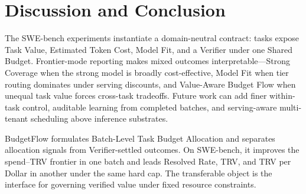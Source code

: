 \documentclass[letterpaper]{article}
\newcommand{\method}{BudgetFlow\xspace}
\newcommand{\trv}{TRV\xspace}
\newcommand{\taskvalue}{Task Value\xspace}
\newcommand{\tokencost}{Estimated Token Cost\xspace}
\newcommand{\modelfit}{Model Fit\xspace}
\newcommand{\sharedbudget}{Shared Budget\xspace}
\newcommand{\verifier}{Verifier\xspace}
\begin{document}
\section{Discussion and Conclusion}
\label{sec:discussion}
The SWE-bench experiments instantiate a domain-neutral contract: tasks expose \taskvalue, \tokencost, \modelfit, and a \verifier under one \sharedbudget. Frontier-mode reporting makes mixed outcomes interpretable---Strong Coverage when the strong model is broadly cost-effective, Model Fit when tier routing dominates under serving discounts, and Value-Aware Budget Flow when unequal task value forces cross-task tradeoffs. Future work can add finer within-task control, auditable learning from completed batches, and serving-aware multi-tenant scheduling above inference substrates.

\method formulates Batch-Level Task Budget Allocation and separates allocation signals from \verifier-settled outcomes. On SWE-bench, it improves the spend--\trv frontier in one batch and leads Resolved Rate, \trv, and \trv per Dollar in another under the same hard cap. The transferable object is the interface for governing verified value under fixed resource constraints.


\end{document}
